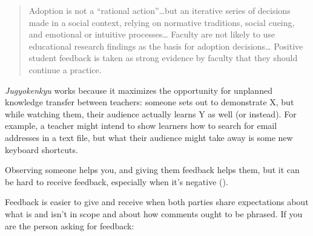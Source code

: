 \begin{quote}

  Adoption is not a ``rational action''{\ldots}but
  an iterative series of decisions made in a social context,
  relying on normative traditions, social cueing,
  and emotional or intuitive processes{\ldots}
  Faculty are not likely to use educational research findings
  as the basis for adoption decisions{\ldots}
  Positive student feedback is taken as strong evidence by faculty
  that they should continue a practice.

\end{quote}

\emph{Jugyokenkyu} works because it maximizes the opportunity for unplanned knowledge transfer between teachers:
someone sets out to demonstrate X,
but while watching them,
their audience actually learns Y as well (or instead).
For example,
a teacher might intend to show learners how to search for email addresses in a text file,
but what their audience might take away is some new keyboard shortcuts.


Observing someone helps you,
and giving them feedback helps them,
but it can be hard to receive feedback,
especially when it's negative ().


Feedback is easier to give and receive when both parties share expectations
about what is and isn't in scope
and about how comments ought to be phrased.
If you are the person asking for feedback:

